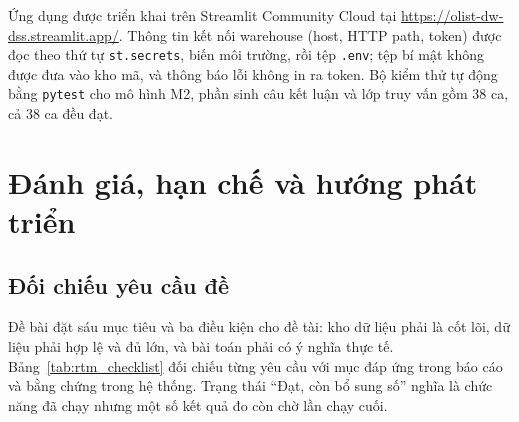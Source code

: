 \documentclass[a4paper]{article}
\begin{document}
Ứng dụng được triển khai trên Streamlit Community Cloud tại \url{https://olist-dw-dss.streamlit.app/}. Thông tin kết nối warehouse (host, HTTP path, token) được đọc theo thứ tự \texttt{st.secrets}, biến môi trường, rồi tệp \texttt{.env}; tệp bí mật không được đưa vào kho mã, và thông báo lỗi không in ra token. Bộ kiểm thử tự động bằng \texttt{pytest} cho mô hình M2, phần sinh câu kết luận và lớp truy vấn gồm 38 ca, cả 38 ca đều đạt.

\section{Đánh giá, hạn chế và hướng phát triển}
\label{sec:ch6}

\subsection{Đối chiếu yêu cầu đề}
\label{subsec:6_1}

Đề bài đặt sáu mục tiêu và ba điều kiện cho đề tài: kho dữ liệu phải là cốt lõi, dữ liệu phải hợp lệ và đủ lớn, và bài toán phải có ý nghĩa thực tế. Bảng~\ref{tab:rtm_checklist} đối chiếu từng yêu cầu với mục đáp ứng trong báo cáo và bằng chứng trong hệ thống. Trạng thái ``Đạt, còn bổ sung số'' nghĩa là chức năng đã chạy nhưng một số kết quả đo còn chờ lần chạy cuối.
\end{document}
